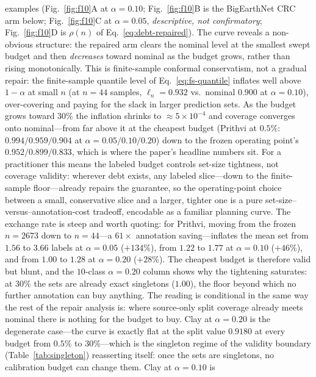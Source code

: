 \documentclass[preprint,11pt,authoryear]{elsarticle}
\begin{document}
examples (Fig.~\ref{fig:f10}A at $\alpha{=}0.10$; Fig.~\ref{fig:f10}B is the BigEarthNet CRC arm below; Fig.~\ref{fig:f10}C at $\alpha{=}0.05$, \emph{descriptive, not confirmatory}; Fig.~\ref{fig:f10}D is $\rho(n)$ of
Eq.~\eqref{eq:debt-repaired}). The curve reveals a non-obvious
structure: the repaired arm clears the nominal level at the smallest swept budget and then
\emph{decreases} toward nominal as the budget grows, rather than rising monotonically. This is
finite-sample conformal conservatism, not a gradual repair: the finite-sample quantile level
of Eq.~\eqref{eq:fs-quantile} inflates well above $1{-}\alpha$ at small $n$ (at $n{=}44$
samples, $\ell_n{=}0.932$ vs.\ nominal $0.900$ at $\alpha{=}0.10$), over-covering and paying for
the slack in larger prediction sets. As the budget grows toward $30\%$ the inflation shrinks to
${\approx}5{\times}10^{-4}$ and coverage converges onto nominal---from far above it at the cheapest
budget (Prithvi at $0.5\%$: $0.994/0.959/0.904$ at $\alpha{=}0.05/0.10/0.20$) down to the frozen
operating point's $0.952/0.899/0.833$, which is where the paper's headline numbers sit.
For a practitioner this means the labeled budget controls set-size tightness, not coverage
validity: wherever debt exists, any labeled slice---down to the finite-sample floor---already repairs
the guarantee, so the operating-point choice between a small, conservative slice and a larger, tighter
one is a pure set-size--versus--annotation-cost tradeoff, encodable as a familiar planning curve. The
exchange rate is steep and worth quoting: for Prithvi, moving from the frozen $n{=}2673$ down to
$n{=}44$---a $61{\times}$ annotation saving---inflates the mean set from $1.56$ to $3.66$ labels at
$\alpha{=}0.05$ ($+134\%$), from $1.22$ to $1.77$ at $\alpha{=}0.10$ ($+46\%$), and from $1.00$ to
$1.28$ at $\alpha{=}0.20$ ($+28\%$). The cheapest budget is therefore valid but blunt, and the $10$-class
$\alpha{=}0.20$ column shows why the tightening saturates: at $30\%$ the sets are already exact
singletons ($1.00$), the floor beyond which no further annotation can buy anything. The
reading is conditional in the same way the rest of the repair analysis is: where source-only split
coverage already meets nominal there is nothing for the budget to buy. Clay at $\alpha{=}0.20$ is the
degenerate case---the curve is exactly flat at the split value $0.9180$ at every budget from $0.5\%$ to
$30\%$---which is the singleton regime of the validity boundary (Table~\ref{tab:singleton}) reasserting
itself: once the sets are singletons, no calibration budget can change them. Clay at $\alpha{=}0.10$ is
\end{document}
